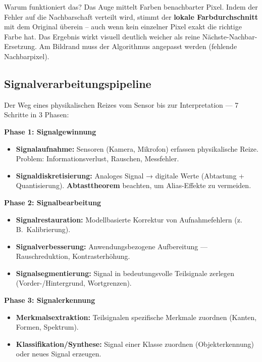 \documentclass[12pt, a4paper]{article}
\begin{document}
\begin{notebox}{Warum funktioniert das?}
Das Auge mittelt Farben benachbarter Pixel. Indem der Fehler auf die Nachbarschaft verteilt wird, stimmt der \textbf{lokale Farbdurchschnitt} mit dem Original überein -- auch wenn kein einzelner Pixel exakt die richtige Farbe hat. Das Ergebnis wirkt visuell deutlich weicher als reine Nächste-Nachbar-Ersetzung. Am Bildrand muss der Algorithmus angepasst werden (fehlende Nachbarpixel).
\end{notebox}

\subsection{Signalverarbeitungspipeline}

Der Weg eines physikalischen Reizes vom Sensor bis zur Interpretation — 7 Schritte in 3 Phasen:

\textbf{Phase 1: Signalgewinnung}
\begin{itemize}
  \item \textbf{Signalaufnahme:} Sensoren (Kamera, Mikrofon) erfassen physikalische Reize. Problem: Informationsverlust, Rauschen, Messfehler.
  \item \textbf{Signaldiskretisierung:} Analoges Signal → digitale Werte (Abtastung + Quantisierung). \textbf{Abtasttheorem} beachten, um Alias-Effekte zu vermeiden.
\end{itemize}

\textbf{Phase 2: Signalbearbeitung}
\begin{itemize}
  \item \textbf{Signalrestauration:} Modellbasierte Korrektur von Aufnahmefehlern (z.\,B.\ Kalibrierung).
  \item \textbf{Signalverbesserung:} Anwendungsbezogene Aufbereitung — Rauschreduktion, Kontrasterhöhung.
  \item \textbf{Signalsegmentierung:} Signal in bedeutungsvolle Teilsignale zerlegen (Vorder-/Hintergrund, Wortgrenzen).
\end{itemize}

\textbf{Phase 3: Signalerkennung}
\begin{itemize}
  \item \textbf{Merkmalsextraktion:} Teilsignalen spezifische Merkmale zuordnen (Kanten, Formen, Spektrum).
  \item \textbf{Klassifikation/Synthese:} Signal einer Klasse zuordnen (Objekterkennung) oder neues Signal erzeugen.
\end{itemize}
\end{document}
